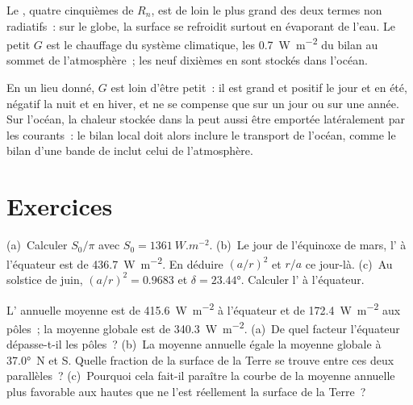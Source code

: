 Le , quatre cinquièmes de $R_n$, est de loin le plus grand des deux
termes non radiatifs~: sur le globe, la surface se refroidit surtout en évaporant de l'eau. Le
petit $G$ est le chauffage du système climatique, les \qty{0.7}{W.m^{-2}} du
bilan au sommet de l'atmosphère~; les neuf dixièmes en sont stockés dans
l'océan.

\begin{remark}\label{rem:b1:radiation-heat-transport:local}
En un lieu donné, $G$ est loin d'être petit~: il est grand et positif le jour et en
été, négatif la nuit et en hiver, et ne se compense que sur un jour ou sur une
année. Sur l'océan, la chaleur stockée dans la  peut aussi être emportée
latéralement par les courants~: le bilan local doit alors inclure le transport de
l'océan, comme le bilan d'une bande de  inclut celui de l'atmosphère.
\end{remark}

\section{Exercices}

\begin{exercise}[$\star$]\label{exo:b1:radiation-heat-transport:1}
(a)~Calculer $S_0/\pi$ avec $S_0 = \qty{1361}{W.m^{-2}}$. (b)~Le jour de l'équinoxe de mars,
l' à l'équateur est de \qty{436.7}{W.m^{-2}}. En déduire
$(a/r)^2$ et $r/a$ ce jour-là. (c)~Au solstice de juin, $(a/r)^2 = 0.9683$ et
$\delta = \ang{23.44}$. Calculer l' à l'équateur.
\end{exercise}

\begin{exercise}[$\star$]\label{exo:b1:radiation-heat-transport:2}
L' annuelle moyenne est de \qty{415.6}{W.m^{-2}} à l'équateur et de
\qty{172.4}{W.m^{-2}} aux pôles~; la moyenne globale est de \qty{340.3}{W.m^{-2}}.
(a)~De quel facteur l'équateur dépasse-t-il les pôles~? (b)~La moyenne annuelle égale la
moyenne globale à \ang{37.0}~N et S. Quelle fraction de la surface de la Terre se trouve entre
ces deux parallèles~? (c)~Pourquoi cela fait-il paraître la courbe de la moyenne annuelle plus
favorable aux hautes  que ne l'est réellement la surface de la Terre~?
\end{exercise}

